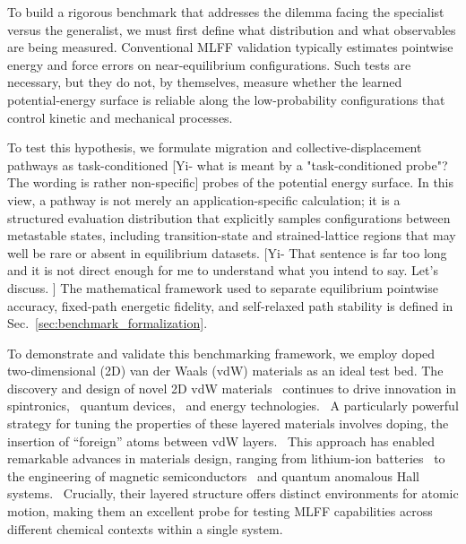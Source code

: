\documentclass[pdflatex,sn-mathphys-num]{sn-jnl}%
\theoremstyle{thmstyleone}%
\theoremstyle{thmstyletwo}%
\theoremstyle{thmstylethree}%
\begin{document}
To build a rigorous benchmark that addresses the dilemma facing the specialist versus the generalist, we must first define what distribution and what observables are being measured. Conventional MLFF validation typically estimates pointwise energy and force errors on near-equilibrium configurations. Such tests are necessary, but they do not, by themselves, measure whether the learned potential-energy surface is reliable along the low-probability configurations that control kinetic and mechanical processes.

To test this hypothesis, we formulate migration and collective-displacement pathways as task-conditioned [Yi- what is meant by a "task-conditioned probe"? The wording is rather non-specific] probes of the potential energy surface. In this view, a pathway is not merely an application-specific calculation; it is a structured evaluation distribution that explicitly samples configurations between metastable states, including transition-state and strained-lattice regions that may well be rare or absent in equilibrium datasets. [Yi- That sentence is far too long and it is not direct enough for me to understand what you intend to say. Let's  discuss. ] The mathematical framework used to separate equilibrium pointwise accuracy, fixed-path energetic fidelity, and self-relaxed path stability is defined in Sec.~\ref{sec:benchmark_formalization}.

To demonstrate and validate this benchmarking framework, we employ doped two-dimensional (2D) van der Waals (vdW) materials as an ideal test bed. The discovery and design of novel 2D vdW materials~\citep{novoselov_2d_2016, manzeli_2d_2017, akinwande2017review, guo_stacking_2021, liu_roadmap_2024} continues to drive innovation in spintronics,~\citep{he_topological_2022} quantum devices,~\citep{qian_van_2024, song_electron_2018, nayak_microsoft_2025} and energy technologies.~\citep{jin_flexible_2019,gautam_creation_2024} A particularly powerful strategy for tuning the properties of these layered materials involves doping, the insertion of ``foreign'' atoms between vdW layers.~\citep{novoselov_2d_2016, whittingham_lithium_2004} This approach has enabled remarkable advances in materials design, ranging from lithium-ion batteries~\citep{winter_insertion_1998, hu_lithium_2024} to the engineering of magnetic semiconductors~\citep{gibertini_magnetic_2019} and quantum anomalous Hall systems.~\citep{tokura_magnetic_2019} Crucially, their layered structure offers distinct environments for atomic motion, making them an excellent probe for testing MLFF capabilities across different chemical contexts within a single system.
\end{document}
